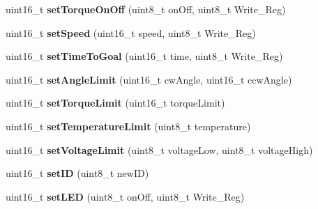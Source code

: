 \begin{DoxyCompactItemize}
\item 
uint16\+\_\+t {\bfseries set\+Torque\+On\+Off} (uint8\+\_\+t on\+Off, uint8\+\_\+t Write\+\_\+\+Reg)\hypertarget{classCytron__G15__Servo_a604e958cb901e69e4431e8c3f69c7852}{}\label{classCytron__G15__Servo_a604e958cb901e69e4431e8c3f69c7852}

\item 
uint16\+\_\+t {\bfseries set\+Speed} (uint16\+\_\+t speed, uint8\+\_\+t Write\+\_\+\+Reg)\hypertarget{classCytron__G15__Servo_ab1f468b2537f84a61531648ca8daf9a8}{}\label{classCytron__G15__Servo_ab1f468b2537f84a61531648ca8daf9a8}

\item 
uint16\+\_\+t {\bfseries set\+Time\+To\+Goal} (uint16\+\_\+t time, uint8\+\_\+t Write\+\_\+\+Reg)\hypertarget{classCytron__G15__Servo_a1f6df0bc7fcb699c912243dc085bee78}{}\label{classCytron__G15__Servo_a1f6df0bc7fcb699c912243dc085bee78}

\item 
uint16\+\_\+t {\bfseries set\+Angle\+Limit} (uint16\+\_\+t cw\+Angle, uint16\+\_\+t ccw\+Angle)\hypertarget{classCytron__G15__Servo_a0d0e80189f19d92dd5b10460fae44ec4}{}\label{classCytron__G15__Servo_a0d0e80189f19d92dd5b10460fae44ec4}

\item 
uint16\+\_\+t {\bfseries set\+Torque\+Limit} (uint16\+\_\+t torque\+Limit)\hypertarget{classCytron__G15__Servo_ad80856fdf4e9d2e82cfd1c3a10b0a9ed}{}\label{classCytron__G15__Servo_ad80856fdf4e9d2e82cfd1c3a10b0a9ed}

\item 
uint16\+\_\+t {\bfseries set\+Temperature\+Limit} (uint8\+\_\+t temperature)\hypertarget{classCytron__G15__Servo_af9c32f2d77cdb6d659758e78d817ed85}{}\label{classCytron__G15__Servo_af9c32f2d77cdb6d659758e78d817ed85}

\item 
uint16\+\_\+t {\bfseries set\+Voltage\+Limit} (uint8\+\_\+t voltage\+Low, uint8\+\_\+t voltage\+High)\hypertarget{classCytron__G15__Servo_a9fc409f1a0eac47437bbee8b529118bf}{}\label{classCytron__G15__Servo_a9fc409f1a0eac47437bbee8b529118bf}

\item 
uint16\+\_\+t {\bfseries set\+ID} (uint8\+\_\+t new\+ID)\hypertarget{classCytron__G15__Servo_aeb2650168794532d9958d9d9ea70be71}{}\label{classCytron__G15__Servo_aeb2650168794532d9958d9d9ea70be71}

\item 
uint16\+\_\+t {\bfseries set\+L\+ED} (uint8\+\_\+t on\+Off, uint8\+\_\+t Write\+\_\+\+Reg)\hypertarget{classCytron__G15__Servo_a1bb28ad77469795332be02e8822449e9}{}\label{classCytron__G15__Servo_a1bb28ad77469795332be02e8822449e9}


\end{DoxyCompactItemize}
